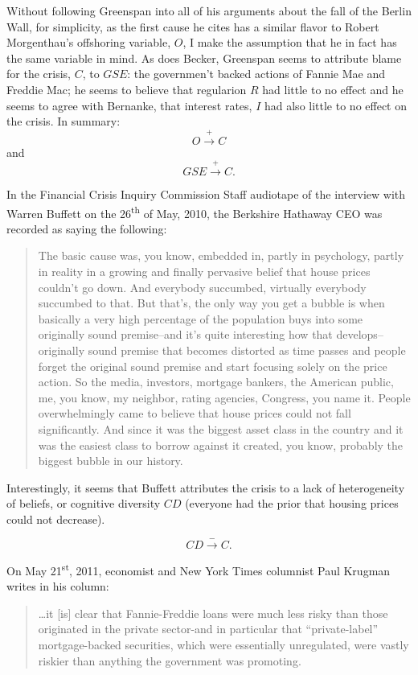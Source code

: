 \documentclass[12pt]{article}
\newcommand{\ts}{\textsuperscript}
\begin{document}
Without following Greenspan into all of his arguments about the fall of the Berlin Wall, for simplicity, as the first cause he cites has a similar flavor to Robert Morgenthau's offshoring variable, $O$, I make the assumption that he in fact has the same variable in mind. As does Becker, Greenspan seems to attribute blame for the crisis, $C$, to $GSE$: the governmen't backed actions of Fannie Mae and Freddie Mac; he seems to believe that regularion $R$ had little to no effect and he seems to agree with Bernanke, that interest rates, $I$ had also little to no effect on the crisis. In summary:\\
$$O \xrightarrow{+} C$$
and
$$GSE \xrightarrow{+} C.$$

In the Financial Crisis Inquiry Commission Staff audiotape of the interview with Warren Buffett on the 26\ts{th} of May, 2010, the Berkshire Hathaway CEO was recorded as saying the following:

\begin{quotation}
The basic cause was, you know, embedded in, partly in psychology, partly in reality in a growing and finally pervasive belief that house prices couldn't go down. And everybody succumbed, virtually everybody succumbed to that. But that's, the only way you get a bubble is when basically a very high percentage of the population buys into some originally sound premise--and it's quite interesting how that develops--originally sound premise that becomes distorted as time passes and people forget the original sound premise and start focusing solely on the price action. So the media, investors, mortgage bankers, the American public, me, you know, my neighbor, rating agencies, Congress, you name it. People overwhelmingly came to believe that house prices could not fall significantly. And since it was the biggest asset class in the country and it was the easiest class to borrow against it created, you know, probably the biggest bubble in our history.
\end{quotation}

Interestingly, it seems that Buffett attributes the crisis to a lack of heterogeneity of beliefs, or cognitive diversity $CD$ (everyone had the prior that housing prices could not decrease).

$$CD \xrightarrow{-} C.$$

On May 21\ts{st}, 2011, economist and New York Times columnist Paul Krugman writes in his column:

\begin{quotation}
\ldots it [is] clear that Fannie-Freddie loans were much less risky than those originated in the private sector-and in particular that ``private-label'' mortgage-backed securities, which were essentially unregulated, were vastly riskier than anything the government was promoting.
\end{quotation}
\end{document}

